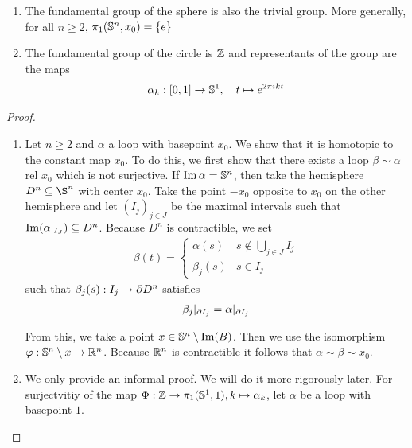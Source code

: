 \begin{thm}[]
  \begin{enumerate}
    \item The fundamental group of the sphere is also the trivial group. More generally, for all $n \geq 2$, $\pi_1(\mathbb{S}^{n},x_0) = \{e\}$ 
    \item The fundamental group of the circle is $\mathbb{Z}$ and representants of the group are the maps
      \begin{align*}
        \alpha_k:[0,1] \to \mathbb{S}^{1}, \quad t \mapsto  e^{2 \pi i k t}
      \end{align*}
  \end{enumerate}
\end{thm}
\begin{proof}
\begin{enumerate}
  \item Let $n \geq 2$ and $\alpha$ a loop with basepoint $x_0$.
    We show that it is homotopic to the constant map $x_0$.
    To do this, we first show that there exists a loop $\beta \sim \alpha$ rel $x_0$ which is not surjective.
    If $\operatorname{Im} \alpha = \mathbb{S}^{n}$, then take the hemisphere $D^{n} \subseteq \S^{n}$ with center $x_0$.
    Take the point $-x_0$ opposite to $x_0$ on the other hemisphere
    and let $(I_j)_{j \in J}$ be the maximal intervals such that $\operatorname{Im}(\alpha |_{I_J}) \subseteq D^{n}$.
    Because $D^{n}$ is contractible, we set
    \begin{align*}
      \beta(t) = \left\{\begin{array}{ll}
          \alpha(s) & s \notin \bigcup_{j \in J}I_j\\
          \beta_j(s) & s \in I_j
      \end{array} \right.
    \end{align*}
    such that $\beta_j(s): I_j \to \partial D^{n}$ satisfies
    \begin{align*}
      \beta_j |_{\partial I_j} = \alpha|_{\partial I_j}
    \end{align*}

    From this, we take a point $x \in \mathbb{S}^{n} \setminus \operatorname{Im}(B)$.
    Then we use the isomorphism $\varphi: \mathbb{S}^{n} \setminus x \to \mathbb{R}^{n}$.
    Because $\mathbb{R}^{n}$ is contractible it follows that $\alpha \sim \beta \sim x_0$.

  \item We only provide an informal proof. We will do it more rigorously later.
    For surjectvitiy of the map $\Phi: \mathbb{Z} \to  \pi_1(\mathbb{S}^{1},1), k \mapsto  \alpha_k$, let $\alpha$ be a loop with basepoint $1$.


\end{enumerate}
\end{proof}
